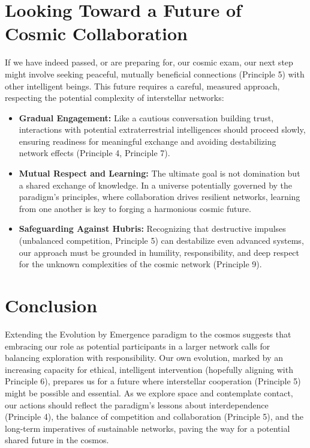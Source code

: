 \section{Looking Toward a Future of Cosmic Collaboration}
If we have indeed passed, or are preparing for, our cosmic exam, our next step might involve seeking peaceful, mutually beneficial connections (Principle 5) with other intelligent beings. This future requires a careful, measured approach, respecting the potential complexity of interstellar networks:
\begin{itemize}
    \item \textbf{Gradual Engagement:} Like a cautious conversation building trust, interactions with potential extraterrestrial intelligences should proceed slowly, ensuring readiness for meaningful exchange and avoiding destabilizing network effects (Principle 4, Principle 7).
    \item \textbf{Mutual Respect and Learning:} The ultimate goal is not domination but a shared exchange of knowledge. In a universe potentially governed by the paradigm's principles, where collaboration drives resilient networks, learning from one another is key to forging a harmonious cosmic future.
    \item \textbf{Safeguarding Against Hubris:} Recognizing that destructive impulses (unbalanced competition, Principle 5) can destabilize even advanced systems, our approach must be grounded in humility, responsibility, and deep respect for the unknown complexities of the cosmic network (Principle 9).
\end{itemize} %

\section{Conclusion}
Extending the Evolution by Emergence paradigm to the cosmos suggests that embracing our role as potential participants in a larger network calls for balancing exploration with responsibility. Our own evolution, marked by an increasing capacity for ethical, intelligent intervention (hopefully aligning with Principle 6), prepares us for a future where interstellar cooperation (Principle 5) might be possible and essential. As we explore space and contemplate contact, our actions should reflect the paradigm's lessons about interdependence (Principle 4), the balance of competition and collaboration (Principle 5), and the long-term imperatives of sustainable networks, paving the way for a potential shared future in the cosmos. %
\cleardoublepage
